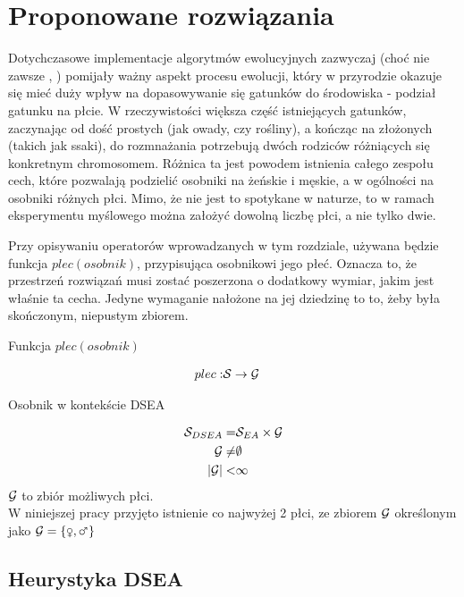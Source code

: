 \documentclass[./FM_mgr.tex]{subfiles}
\begin{document}
\chapter{Proponowane rozwiązania} \label{chapter:proposed}

Dotychczasowe implementacje algorytmów ewolucyjnych zazwyczaj (choć nie zawsze \cite{GGA}, \cite{SexualGA}) pomijały ważny aspekt procesu ewolucji, który w przyrodzie okazuje się mieć duży wpływ na dopasowywanie się gatunków do środowiska - podział gatunku na płcie. 
W rzeczywistości większa część istniejących gatunków, zaczynając od dość prostych (jak owady, czy rośliny), a kończąc na złożonych (takich jak ssaki), do rozmnażania potrzebują dwóch rodziców różniących się konkretnym chromosomem. 
Różnica ta jest powodem istnienia całego zespołu cech, które pozwalają podzielić osobniki na żeńskie i męskie, a w ogólności na osobniki różnych płci. 
Mimo, że nie jest to spotykane w naturze, to w ramach eksperymentu myślowego można założyć dowolną liczbę płci, a nie tylko dwie.

Przy opisywaniu operatorów wprowadzanych w tym rozdziale, używana będzie funkcja $plec(osobnik)$, przypisująca osobnikowi jego płeć.
Oznacza to, że przestrzeń rozwiązań musi zostać poszerzona o dodatkowy wymiar, jakim jest właśnie ta cecha.
Jedyne wymaganie nałożone na jej dziedzinę to to, żeby była skończonym, niepustym zbiorem.

\begin{signature}
	\caption{Funkcja $plec(osobnik)$ \label{signature:genderFoo}}
	\begin{align}
	plec: & \mathcal{S} \rightarrow \mathcal{G}
	\end{align}
\end{signature}

\begin{signature}
	\caption{Osobnik w kontekście DSEA \label{signature:specimen_dsea}}
	\begin{align}
	\mathcal{S}_{DSEA} = &\mathcal{S}_{EA} \times \mathcal{G} \\
	\mathcal{G} \neq & \emptyset \\
	|\mathcal{G}| < &\infty
	\end{align}	
	$\mathcal{G}$ to zbiór możliwych płci.\\
	W niniejszej pracy przyjęto istnienie co najwyżej 2 płci, ze zbiorem $\mathcal{G}$ określonym jako $\important{G} = \{ \female, \male \}$
\end{signature}

\section{Heurystyka DSEA} \label{section:dsea}
\end{document}
